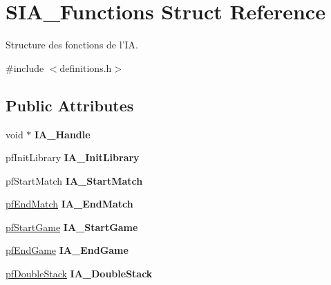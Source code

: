 \hypertarget{structSIA__Functions}{
\section{SIA\_\-Functions Struct Reference}
\label{structSIA__Functions}
}


Structure des fonctions de l'IA.  




{\ttfamily \#include $<$definitions.h$>$}

\subsection*{Public Attributes}
\begin{DoxyCompactItemize}
\item 
\hypertarget{structSIA__Functions_ad443b6b51aa961175f550c9c8c49bf32}{
void $\ast$ {\bfseries IA\_\-Handle}}
\label{structSIA__Functions_ad443b6b51aa961175f550c9c8c49bf32}

\item 
\hypertarget{structSIA__Functions_a2f5163602bd4a2dfda4bda5500a66c2d}{
pfInitLibrary {\bfseries IA\_\-InitLibrary}}
\label{structSIA__Functions_a2f5163602bd4a2dfda4bda5500a66c2d}

\item 
\hypertarget{structSIA__Functions_aab83b6d29afba150e9163c53f99ea996}{
pfStartMatch {\bfseries IA\_\-StartMatch}}
\label{structSIA__Functions_aab83b6d29afba150e9163c53f99ea996}

\item 
\hypertarget{structSIA__Functions_af59521efcef5121af6c1ba947f07d28e}{
\hyperlink{backgammon_8h_a404e0ed0163af0c5c5fa9ab64245560f}{pfEndMatch} {\bfseries IA\_\-EndMatch}}
\label{structSIA__Functions_af59521efcef5121af6c1ba947f07d28e}

\item 
\hypertarget{structSIA__Functions_aa6ac0f45cc8464b1f34c76afaad3be84}{
\hyperlink{backgammon_8h_aa8f2f8105935134a0c17112672e4b44d}{pfStartGame} {\bfseries IA\_\-StartGame}}
\label{structSIA__Functions_aa6ac0f45cc8464b1f34c76afaad3be84}

\item 
\hypertarget{structSIA__Functions_a5b4d8e436f88506e817c12d6653fb496}{
\hyperlink{backgammon_8h_a20a1003aff74fb4fd370b6e5f4181c2d}{pfEndGame} {\bfseries IA\_\-EndGame}}
\label{structSIA__Functions_a5b4d8e436f88506e817c12d6653fb496}

\item 
\hypertarget{structSIA__Functions_ac5881df8ced8a844f78a5c6cf3d834e5}{
\hyperlink{backgammon_8h_a83fca1969157bef7e9ba7497b5f7333c}{pfDoubleStack} {\bfseries IA\_\-DoubleStack}}
\label{structSIA__Functions_ac5881df8ced8a844f78a5c6cf3d834e5}


\end{DoxyCompactItemize}
